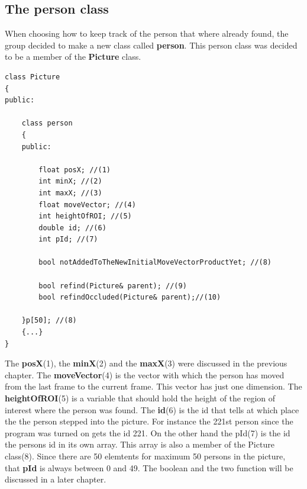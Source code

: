 \subsection{The person class}
When choosing how to keep track of the person that where already found, the group decided to make a new class called \textbf{person}. This person class was decided to be a member of the \textbf{Picture} class. 
\begin{lstlisting}
class Picture
{
public:
	
	class person
	{
	public:

		float posX; //(1)
		int minX; //(2)
		int maxX; //(3)
		float moveVector; //(4)
		int heightOfROI; //(5)
		double id; //(6)
		int pId; //(7)

		bool notAddedToTheNewInitialMoveVectorProductYet; //(8)

		bool refind(Picture& parent); //(9)
		bool refindOccluded(Picture& parent);//(10)

	}p[50]; //(8)
	{...}
}
\end{lstlisting}
The \textbf{posX}(1), the \textbf{minX}(2) and the \textbf{maxX}(3) were discussed in the previous chapter. The \textbf{moveVector}(4) is the vector with which the person has moved from the last frame to the current frame. This vector has just one dimension. The \textbf{heightOfROI}(5) is a variable that should hold the height of the region of interest where the person was found. The \textbf{id}(6) is the id that tells at which place the the person stepped into the picture. For instance the 221st person since the program was turned on gets the id 221. On the other hand the pId(7) is the id the persons id in its own array. This array is also a member of the Picture class(8). Since there are 50 elemtents for maximum 50 persons in the picture, that \textbf{pId} is always between 0 and 49. 
The boolean and the two function will be discussed in a later chapter.

